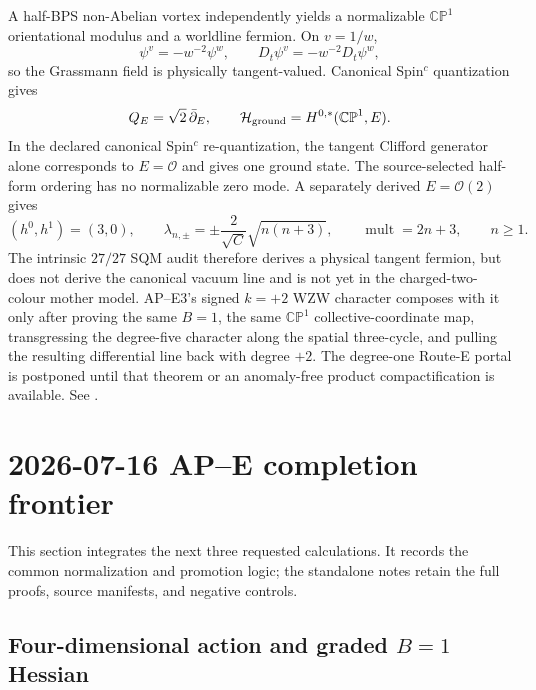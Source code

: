 \documentclass[11pt]{article}
\numberwithin{equation}{section}
\newcommand{\CP}{\mathbb{CP}}
\newcommand{\cO}{\mathcal O}
\newcommand{\cH}{\mathcal H}
\begin{document}
A half-BPS non-Abelian vortex independently yields a normalizable
\(\CP^1\) orientational modulus and a worldline fermion.  On \(v=1/w\),
\begin{equation}
 \psi^v=-w^{-2}\psi^w,\qquad
 D_t\psi^v=-w^{-2}D_t\psi^w,
 \label{eq:handoff-tangent-fermion}
\end{equation}
so the Grassmann field is physically tangent-valued.  Canonical
Spin\({}^c\) quantization gives
\begin{equation}
 Q_E=\sqrt2\,\bar\partial_E,\qquad
 \cH_{\rm ground}=H^{0,*}(\CP^1,E).
 \label{eq:handoff-sqm}
\end{equation}
In the declared canonical Spin\({}^c\) re-quantization, the tangent Clifford
generator alone corresponds to \(E=\cO\) and gives one ground state.  The
source-selected half-form ordering has no normalizable zero mode.  A
separately derived \(E=\cO(2)\) gives
\begin{equation}
 (h^0,h^1)=(3,0),\qquad
 \lambda_{n,\pm}=\pm\frac2{\sqrt C}\sqrt{n(n+3)},\qquad
 \operatorname{mult}=2n+3,\qquad n\ge1.
 \label{eq:handoff-sqm-spectrum}
\end{equation}
The intrinsic \(27/27\) SQM audit therefore derives a physical tangent
fermion, but does not derive the canonical vacuum line and is not yet in the
charged-two-colour mother model.  AP--E3's signed \(k=+2\) WZW character
composes with it only after proving the same \(B=1\), the same \(\CP^1\)
collective-coordinate map, transgressing the degree-five character along the
spatial three-cycle, and pulling the resulting differential line back with
degree \(+2\).  The
degree-one Route-E portal is postponed until that theorem or an anomaly-free
product compactification is available.  See
.

\section{2026-07-16 AP--E completion frontier}

This section integrates the next three requested calculations.  It records
the common normalization and promotion logic; the standalone notes retain
the full proofs, source manifests, and negative controls.

\subsection{\texorpdfstring{Four-dimensional action and graded \(B=1\)
Hessian}{Four-dimensional action and graded B=1 Hessian}}
\end{document}
